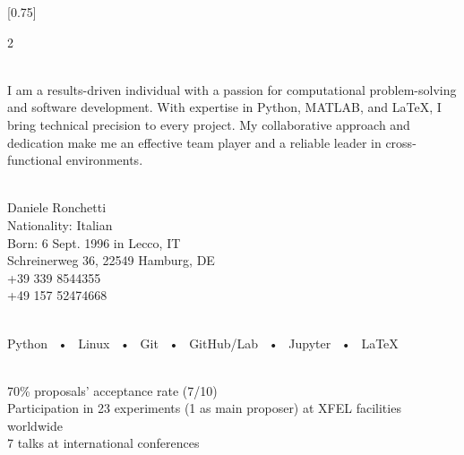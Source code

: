 \documentclass[lighthipster]{simplehipstercv}
\begin{document}
\thispagestyle{empty}






[0.75]
\begin{paracol}{2}
\paracolbackgroundoptions
\footnotesize
{\setasidefontcolour
\flushright

\begin{center}
\end{center}
\bigskip

\\[0.5em]
I am a results-driven individual with a passion for computational problem-solving and software development. With expertise in Python, MATLAB, and \LaTeX{}, I bring technical precision to every project. My collaborative approach and dedication make me an effective team player and a reliable leader in cross-functional environments.
\bigskip

 \\[0.5em]
Daniele Ronchetti\\
Nationality: Italian\\
Born: 6 Sept. 1996 in Lecco, IT\\
 Schreinerweg 36, 22549 Hamburg, DE\\
 +39 339 8544355\\
 +49 157 52474668
\bigskip

 \\[0.5em]
Python ~•~ Linux ~•~ Git ~•~ GitHub/Lab ~•~ Jupyter ~•~ \LaTeX{} 
\bigskip

 \\[0.5em]
 70\% proposals' acceptance rate (7/10)\\
 Participation in 23 experiments (1 as main proposer) at XFEL facilities worldwide\\
 7 talks at international conferences\\
\bigskip

}
\end{paracol}
\end{document}
